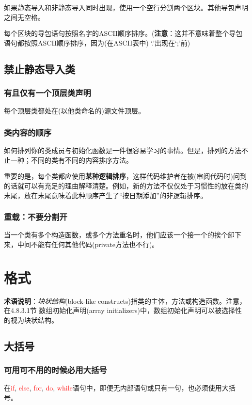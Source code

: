 \documentclass[cn,11pt,chinese]{elegantbook}
\begin{document}
如果静态导入和非静态导入同时出现，使用一个空行分割两个区块。其他导包声明之间无空格。

每个区块的导包语句按照名字的ASCII顺序排序。(\textbf{注意}：这并不意味着整个导包语句都按照ASCII顺序排序，因为(在ASCII表中) `.'出现在`;'前)

\section{禁止静态导入类}
\subsection{有且仅有一个顶层类声明}
每个顶层类都处在(以他类命名的)源文件顶层。

\subsection{类内容的顺序}
如何排列你的类成员与初始化函数是一件很容易学习的事情。但是，排列的方法不止一种；不同的类有不同的内容排序方法。

重要的是，每个类都应使用\textbf{某种逻辑排序}，这样代码维护者在被(审阅代码时)问到的话就可以有充足的理由解释清楚。例如，新的方法不仅仅处于习惯性的放在类的末尾，放在末尾意味着此种顺序产生了``按日期添加''的非逻辑排序。

\subsection{重载：不要分割开}
当一个类有多个构造函数，或多个方法重名时，他们应该一个接一个的挨个卸下来，中间不能有任何其他代码(private方法也不行)。

\chapter{格式}
\textbf{术语说明}：\emph{块状结构}(block-like constructs)指类的主体，方法或构造函数。注意，在4.8.3.1节 数组初始化声明(array initializers)中，数组初始化声明可以被选择性的视为块状结构。

\section{大括号}
\subsection{可用可不用的时候必用大括号}
在\textcolor{red}{if}, \textcolor{red}{else}, \textcolor{red}{for}, \textcolor{red}{do}, \textcolor{red}{while}语句中，即便无内部语句或只有一句，也必须使用大括号。
\end{document}
